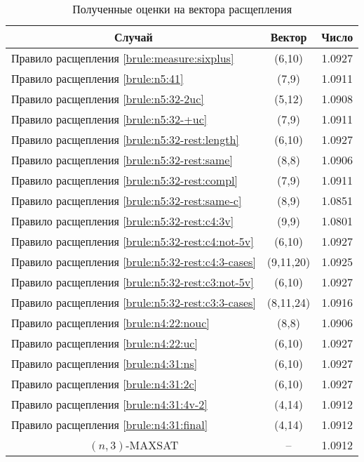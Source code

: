 \begin{table}[ht]
 \centering
 \caption{Полученные оценки на вектора расщепления}
 \begin{tabular}{|l|c|c|}
  \hline
  \multicolumn{1}{|c|}{\textbf{Случай}} & \textbf{Вектор} & \textbf{Число} \\
  \hline
  Правило расщепления \ref{brule:measure:sixplus}
          & (6,10)
          & 1.0927 \\
  Правило расщепления \ref{brule:n5:41}
          & (7,9)
          & 1.0911 \\
  Правило расщепления \ref{brule:n5:32-2uc}
          & (5,12)
          & 1.0908 \\
  Правило расщепления \ref{brule:n5:32-+uc}
          & (7,9)
          & 1.0911 \\
  Правило расщепления \ref{brule:n5:32-rest:length}
          & (6,10)
          & 1.0927 \\
  Правило расщепления \ref{brule:n5:32-rest:same}
          & (8,8)
          & 1.0906 \\
  Правило расщепления \ref{brule:n5:32-rest:compl}
          & (7,9)
          & 1.0911 \\
  Правило расщепления \ref{brule:n5:32-rest:same-c}
          & (8,9)
          & 1.0851 \\
  Правило расщепления \ref{brule:n5:32-rest:c4:3v}
          & (9,9)
          & 1.0801 \\
  Правило расщепления \ref{brule:n5:32-rest:c4:not-5v}
          & (6,10)
          & 1.0927 \\
  Правило расщепления \ref{brule:n5:32-rest:c4:3-cases}
          & (9,11,20)
          & 1.0925 \\
  Правило расщепления \ref{brule:n5:32-rest:c3:not-5v}
          & (6,10)
          & 1.0927 \\
  Правило расщепления \ref{brule:n5:32-rest:c3:3-cases}
          & (8,11,24)
          & 1.0916 \\
  Правило расщепления \ref{brule:n4:22:nouc}
          & (8,8)
          & 1.0906 \\
  Правило расщепления \ref{brule:n4:22:uc}
          & (6,10)
          & 1.0927 \\
  Правило расщепления \ref{brule:n4:31:ns}
          & (6,10)
          & 1.0927 \\
  Правило расщепления \ref{brule:n4:31:2c}
          & (6,10)
          & 1.0927 \\
  Правило расщепления \ref{brule:n4:31:4v-2}
          & (4,14)
          & 1.0912 \\
  Правило расщепления \ref{brule:n4:31:final}
          & (4,14)
          & 1.0912 \\
  \hline
  \multicolumn{1}{|c|}{$(n,3)$-MAXSAT}
          & --
          & 1.0912 \\
  \hline
 \end{tabular}
 \label{table:conclusion:vectors}
\end{table}

